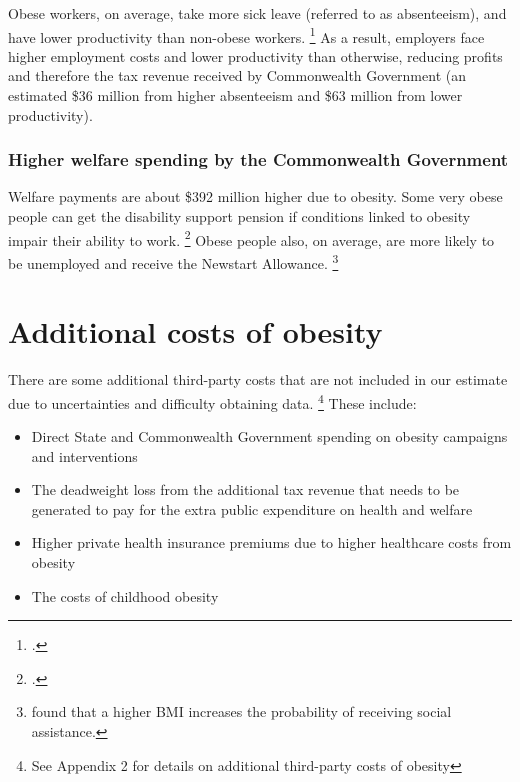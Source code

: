 \documentclass[embargoed]{grattan}
\begin{document}
Obese workers, on average, take more sick leave (referred to as absenteeism), and have lower productivity than non-obese workers.%
\footcites{RepresentativesStandingCommitteeonHealth2009Weighingitup}{Medibank2011SickWorkcost} As a result, employers face higher employment costs and lower productivity than otherwise, reducing profits and therefore the tax revenue received by Commonwealth Government (an estimated \$36 million from higher absenteeism and \$63 million from lower productivity).

\subsubsection{Higher welfare spending by the Commonwealth Government }\label{higher-welfare-spending-by-the-commonwealth-government}

Welfare payments are about \$392 million higher due to obesity.
Some very obese people can get the disability support pension if conditions linked to obesity impair their ability to work.%
\footcite{SocialServices2014FrequentlyAskedQuestions} Obese people also, on average, are more likely to be unemployed and receive the Newstart Allowance.%
\footnote{\textcite{Boeckerman2016EffectWeightLabor} found that a higher BMI increases the probability of receiving social assistance.}

\section{Additional costs of obesity }\label{additional-costs-of-obesity}

There are some additional third-party costs that are not included in our estimate due to uncertainties and difficulty obtaining data.%
\footnote{See Appendix 2 for details on additional third-party costs of obesity} These include:

\begin{itemize}
\item
  Direct State and Commonwealth Government spending on obesity campaigns and interventions
\item
  The deadweight loss from the additional tax revenue that needs to be generated to pay for the extra public expenditure on health and welfare
\item
  Higher private health insurance premiums due to higher healthcare costs from obesity
\item
  The costs of childhood obesity
\end{itemize}
\end{document}
